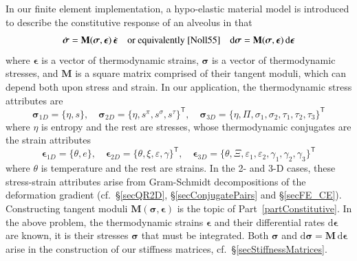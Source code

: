 In our finite element implementation, a hypo-elastic material model \cite{Truesdell55} is introduced to describe the constitutive response of an alveolus in that
\begin{displaymath}
    \dot{\boldsymbol{\sigma}} = \mathbf{M} ( \boldsymbol{\sigma} , \boldsymbol{\epsilon} ) \, \dot{\boldsymbol{\epsilon}} 
    \quad \text{or equivalently \cite{Noll55}} \quad
    \mathrm{d} \boldsymbol{\sigma} = \mathbf{M} ( \boldsymbol{\sigma} , \boldsymbol{\epsilon} ) \, \mathrm{d} \boldsymbol{\epsilon}
\end{displaymath} 
where $\boldsymbol{\epsilon}$ is a vector of thermo\-dynamic strains, $\boldsymbol{\sigma}$ is a vector of thermo\-dynamic stresses, and $\mathbf{M}$ is a square matrix comprised of their tangent moduli, which can depend both upon stress and strain.  In our application, the thermo\-dynamic stress attributes are 
\begin{displaymath}
   \boldsymbol{\sigma}_{1D} = \{ \eta , s \} , \quad
   \boldsymbol{\sigma}_{2D} = \{ \eta , s^{\pi} , s^{\sigma} , s^{\tau} \}^{\mathsf{T}} , \quad
   \boldsymbol{\sigma}_{3D} = \{ \eta , \Pi , \sigma_1 , \sigma_2 , \tau_1 , \tau_2 , \tau_3 \}^{\mathsf{T}}
\end{displaymath}
where $\eta$ is entropy and the rest are stresses, whose thermo\-dynamic conjugates are the strain attributes
\begin{displaymath}
\boldsymbol{\epsilon}_{1D} = \{ \theta , e \} , \quad
\boldsymbol{\epsilon}_{2D} = \{ \theta , \xi , \varepsilon , \gamma \}^{\mathsf{T}} , \quad
\boldsymbol{\epsilon}_{3D} = \{ \theta , \Xi , \varepsilon_1 , \varepsilon_2 , \gamma_1 , \gamma_2 , \gamma_3 \}^{\mathsf{T}}
\end{displaymath}
where $\theta$ is temperature and the rest are strains.  In the 2- and 3-D cases, these stress-strain attributes arise from Gram-Schmidt decompositions of the deformation gradient (cf.\ \S\ref{secQR2D}, \S\ref{secConjugatePairs} and \S\ref{secFE_CE}).  Constructing tangent moduli $\mathbf{M} ( \boldsymbol{\sigma} , \boldsymbol{\epsilon} )$ is the topic of Part~\ref{partConstitutive}.  In the above problem, the thermo\-dynamic strains $\boldsymbol{\epsilon}$ and their differential rates $\mathrm{d} \boldsymbol{\epsilon}$ are known, it is their stresses $\boldsymbol{\sigma}$ that must be integrated.  Both $\boldsymbol{\sigma}$ and $\mathrm{d} \boldsymbol{\sigma} = \mathbf{M} \, \mathrm{d} \boldsymbol{\epsilon}$ arise in the construction of our stiffness matrices, cf.\ \S\ref{secStiffnessMatrices}.


